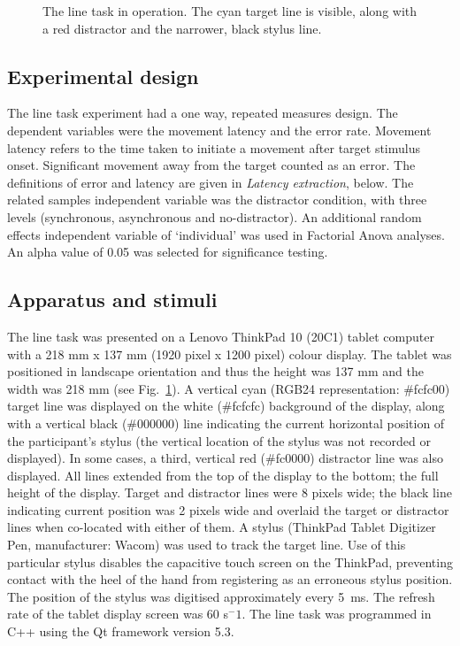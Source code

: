 \documentclass[10pt,letterpaper]{article}
\begin{document}
\begin{figure}[htb!]
\centering
\caption[The line task.]
{The line task in operation. The cyan
  target line is visible, along with a red distractor and the
  narrower, black stylus line.}
\label{linetask}
\end{figure}

\subsection*{Experimental design}
The line task experiment had a one way, repeated measures design. The
dependent variables were the movement latency and the error
rate. Movement latency refers to the time taken to initiate a movement
after target stimulus onset. Significant movement away from the target
counted as an error. The definitions of error and latency are given in
\emph{Latency extraction}, below. The related samples independent
variable was the distractor condition, with three levels (synchronous,
asynchronous and no-distractor). An additional random effects
independent variable of `individual' was used in Factorial Anova
analyses. An alpha value of 0.05 was selected for significance
testing. %

\subsection*{Apparatus and stimuli}
The line task was presented on a Lenovo ThinkPad 10 (20C1) tablet
computer with a 218 mm x 137 mm (1920 pixel x 1200 pixel) colour
display. The tablet was positioned in landscape orientation and thus
the height was 137 mm and the width was 218 mm (see
Fig.~\ref{linetask}). A vertical cyan (RGB24 representation: \#fcfc00)
target line was displayed on the white (\#fcfcfc) background of the
display, along with a vertical black (\#000000) line indicating the
current horizontal position of the participant's stylus (the vertical
location of the stylus was not recorded or displayed). In some cases,
a third, vertical red (\#fc0000) distractor line was also
displayed. All lines extended from the top of the display to the
bottom; the full height of the display. Target and distractor lines
were 8 pixels wide; the black line indicating current position was 2
pixels wide and overlaid the target or distractor lines when
co-located with either of them. A stylus (ThinkPad Tablet Digitizer
Pen, manufacturer: Wacom) was used to track the target line. Use of
this particular stylus disables the capacitive touch screen on the
ThinkPad, preventing contact with the heel of the hand from
registering as an erroneous stylus position. The position of the
stylus was digitised approximately every 5~ms.
The refresh rate of the tablet display screen was 60 s$^-1$. The line
task was programmed in C++ using the Qt framework version 5.3.
\end{document}
